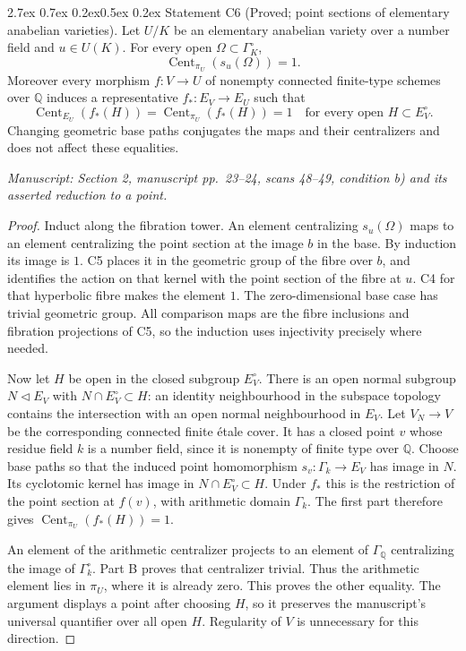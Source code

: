 \documentclass[11pt,a4paper]{article}
\makeatletter
\newcommand{\Cent}{\operatorname{Cent}}
\newcommand{\Q}{\mathbb Q}
\newcommand{\passage}[1]{\par\smallskip\noindent\textit{Manuscript: #1}\par\smallskip}
\renewcommand\paragraph{\@startsection{paragraph}{4}{\z@}%
  {2.7ex \@plus 0.7ex \@minus 0.2ex}{0.5ex \@plus 0.2ex}%
  {\normalfont\normalsize\bfseries}}
\makeatother
\begin{document}
\paragraph{Statement C6 (Proved; point sections of elementary anabelian varieties).}\label{res:C6}
Let $U/K$ be an elementary anabelian variety over a number field and $u\in U(K)$. For every open $\Omega\subset\Gamma_K^\circ$,
\[
 \Cent_{\pi_U}(s_u(\Omega))=1.
\]
Moreover every morphism $f:V\to U$ of nonempty connected finite-type schemes over $\Q$ induces a representative $f_*:E_V\to E_U$ such that
\[
 \Cent_{E_U}(f_*(H))=\Cent_{\pi_U}(f_*(H))=1
 \quad\text{for every open }H\subset E_V^\circ.
\]
Changing geometric base paths conjugates the maps and their centralizers and does not affect these equalities.
\passage{Section 2, manuscript pp.~23--24, scans 48--49, condition b) and its asserted reduction to a point.}
\begin{proof}
Induct along the fibration tower. An element centralizing $s_u(\Omega)$ maps to an element centralizing the point section at the image $b$ in the base. By induction its image is $1$. C5 places it in the geometric group of the fibre over $b$, and identifies the action on that kernel with the point section of the fibre at $u$. C4 for that hyperbolic fibre makes the element $1$. The zero-dimensional base case has trivial geometric group. All comparison maps are the fibre inclusions and fibration projections of C5, so the induction uses injectivity precisely where needed.

Now let $H$ be open in the closed subgroup $E_V^\circ$. There is an open normal subgroup $N\triangleleft E_V$ with $N\cap E_V^\circ\subset H$: an identity neighbourhood in the subspace topology contains the intersection with an open normal neighbourhood in $E_V$. Let $V_N\to V$ be the corresponding connected finite étale cover. It has a closed point $v$ whose residue field $k$ is a number field, since it is nonempty of finite type over $\Q$. Choose base paths so that the induced point homomorphism $s_v:\Gamma_k\to E_V$ has image in $N$. Its cyclotomic kernel has image in $N\cap E_V^\circ\subset H$. Under $f_*$ this is the restriction of the point section at $f(v)$, with arithmetic domain $\Gamma_k$. The first part therefore gives $\Cent_{\pi_U}(f_*(H))=1$.

An element of the arithmetic centralizer projects to an element of $\Gamma_\Q$ centralizing the image of $\Gamma_k^\circ$. Part B proves that centralizer trivial. Thus the arithmetic element lies in $\pi_U$, where it is already zero. This proves the other equality. The argument displays a point after choosing $H$, so it preserves the manuscript's universal quantifier over all open $H$. Regularity of $V$ is unnecessary for this direction.
\end{proof}
\end{document}
